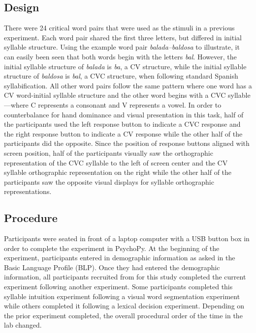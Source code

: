 \subsection{Design}
There were 24 critical word pairs that were used as the stimuli in a previous experiment. Each word pair shared the first three letters, but differed in initial syllable structure. Using the example word pair \emph{balada–baldosa} to illustrate, it can easily been seen that both words begin with the letters \emph{bal}. However, the initial syllable structure of \emph{balada} is \emph{ba}, a CV structure, while the initial syllable structure of \emph{baldosa} is \emph{bal}, a CVC structure, when following standard Spanish syllabification. All other word pairs follow the same pattern where one word has a CV word-initial syllable structure and the other word begins with a CVC syllable---where C represents a consonant and V represents a vowel. In order to counterbalance for hand dominance and visual presentation in this task, half of the participants used the left response button to indicate a CVC response and the right response button to indicate a CV response while the other half of the participants did the opposite. Since the position of response buttons aligned with screen position, half of the participants visually saw the orthographic representation of the CVC syllable to the left of screen center and the CV syllable orthographic representation on the right while the other half of the participants saw the opposite visual displays for syllable orthographic representations.




\subsection{Procedure}
Participants were seated in front of a laptop computer with a USB button box in order to complete the experiment in PsychoPy. At the beginning of the experiment, participants entered in demographic information as asked in the Basic Language Profile (BLP). Once they had entered the demographic information, all participants recruited from for this study completed the current experiment following another experiment. Some participants completed this syllable intuition experiment following a visual word segmentation experiment while others completed it following a lexical decision experiment. Depending on the prior experiment completed, the overall procedural order of the time in the lab changed.

